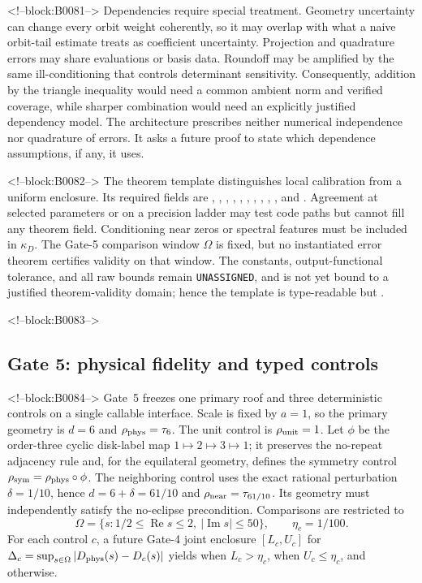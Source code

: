 \documentclass[11pt,a4paper]{article}
\begin{document}
<!--block:B0081-->
Dependencies require special treatment. Geometry uncertainty can change every orbit weight coherently, so it may overlap with what a naive orbit-tail estimate treats as coefficient uncertainty. Projection and quadrature errors may share evaluations or basis data. Roundoff may be amplified by the same ill-conditioning that controls determinant sensitivity. Consequently, addition by the triangle inequality would need a common ambient norm and verified coverage, while sharper combination would need an explicitly justified dependency model. The architecture prescribes neither numerical independence nor quadrature of errors. It asks a future proof to state which dependence assumptions, if any, it uses.

<!--block:B0082-->
The theorem template distinguishes local calibration from a uniform enclosure. Its required fields are , , , , , , , , , , and . Agreement at selected parameters or on a precision ladder may test code paths but cannot fill any theorem field. Conditioning near zeros or spectral features must be included in \(\kappa_D\). The Gate-5 comparison window \(\Omega\) is fixed, but no instantiated error theorem certifies validity on that window. The constants, output-functional tolerance, and all raw bounds remain \texttt{UNASSIGNED}, and  is not yet bound to a justified theorem-validity domain; hence the template is type-readable but .

<!--block:B0083-->
\subsection{Gate 5: physical fidelity and typed controls}

<!--block:B0084-->
Gate~5 freezes one primary roof and three deterministic controls on a single
callable interface.  Scale is fixed by \(a=1\), so the primary geometry is
\(d=6\) and \(\rho_{\rm phys}=\tau_6\).  The unit control is
\(\rho_{\rm unit}=1\).  Let \(\phi\) be the order-three cyclic disk-label map
\(1\mapsto2\mapsto3\mapsto1\); it preserves the no-repeat adjacency rule and,
for the equilateral geometry, defines the symmetry control
\(\rho_{\rm sym}=\rho_{\rm phys}\circ\phi\).  The neighboring control uses
the exact rational perturbation \(\delta=1/10\), hence
\(d=6+\delta=61/10\) and \(\rho_{\rm near}=\tau_{61/10}\).  Its geometry must
independently satisfy the no-eclipse precondition.  Comparisons are restricted to
\[
  \Omega=\{s:1/2\leq\operatorname{Re}s\leq2,
  \ |\operatorname{Im}s|\leq50\},\qquad \eta_c=1/100.
\]
For each control \(c\), a future Gate-4 joint enclosure
\([L_c,U_c]\) for
\(\Delta_c=\sup_{s\in\Omega}|D_{\rm phys}(s)-D_c(s)|\) yields
 when \(L_c>\eta_c\),  when
\(U_c\leq\eta_c\), and  otherwise.
\end{document}
